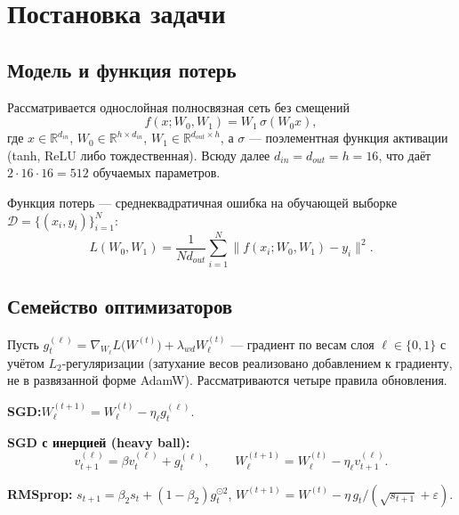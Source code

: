 \section{Постановка задачи}\label{sec:problem}

\subsection{Модель и функция потерь}

Рассматривается однослойная полносвязная сеть без смещений
\begin{equation}
  f(x; W_0, W_1) = W_1\,\sigma(W_0 x),
\end{equation}
где $x\in\mathbb{R}^{d_{in}}$, $W_0\in\mathbb{R}^{h\times d_{in}}$,
$W_1\in\mathbb{R}^{d_{out}\times h}$, а $\sigma$ --- поэлементная функция
активации (tanh, ReLU либо тождественная). Всюду далее
$d_{in}=d_{out}=h=16$, что даёт $2\cdot 16\cdot 16 = 512$ обучаемых параметров.

Функция потерь --- среднеквадратичная ошибка на обучающей выборке
$\mathcal{D}=\{(x_i,y_i)\}_{i=1}^{N}$:
\begin{equation}
  L(W_0,W_1) = \frac{1}{N d_{out}}\sum_{i=1}^{N}\bigl\|f(x_i;W_0,W_1)-y_i\bigr\|^2 .
\end{equation}

\subsection{Семейство оптимизаторов}

Пусть $g_t^{(\ell)} = \nabla_{W_\ell} L\bigl(W^{(t)}\bigr) + \lambda_{wd} W^{(t)}_\ell$ ---
градиент по весам слоя $\ell\in\{0,1\}$ с учётом $L_2$-регуляризации
(затухание весов реализовано добавлением к градиенту, не в развязанной форме
AdamW). Рассматриваются четыре правила обновления.

\smallskip
\noindent\textbf{SGD:}\quad $W^{(t+1)}_\ell = W^{(t)}_\ell - \eta_\ell g^{(\ell)}_t$.

\smallskip
\noindent\textbf{SGD с инерцией (heavy ball):}
\begin{equation}\label{eq:hb}
  v^{(\ell)}_{t+1} = \beta v^{(\ell)}_t + g^{(\ell)}_t,
  \qquad
  W^{(t+1)}_\ell = W^{(t)}_\ell - \eta_\ell v^{(\ell)}_{t+1}.
\end{equation}

\smallskip
\noindent\textbf{RMSprop:}\quad
$s_{t+1} = \beta_2 s_t + (1-\beta_2) g_t^{\odot 2}$,\quad
$W^{(t+1)} = W^{(t)} - \eta\, g_t / (\sqrt{s_{t+1}}+\varepsilon)$.

